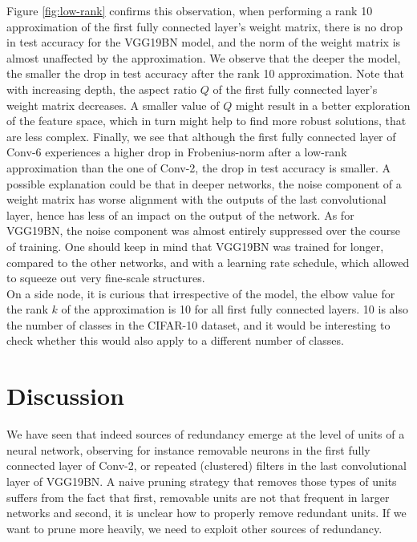 Figure \ref{fig:low-rank} confirms this observation, when performing a rank 10 approximation of the first fully connected layer's weight matrix, there is no drop in test accuracy for the VGG19BN model, and the norm of the weight matrix is almost unaffected by the approximation. We observe that the deeper the model, the smaller the drop in test accuracy after the rank 10 approximation. Note that with increasing depth, the aspect ratio $Q$ of the first fully connected layer's weight matrix decreases. A smaller value of $Q$ might result in a better exploration of the feature space, which in turn might help to find more robust solutions, that are less complex. Finally, we see that although the first fully connected layer of Conv-6 experiences a higher drop in Frobenius-norm after a low-rank approximation than the one of Conv-2, the drop in test accuracy is smaller. A possible explanation could be that in deeper networks, the noise component of a weight matrix has worse alignment with the outputs of the last convolutional layer, hence has less of an impact on the output of the network. As for VGG19BN, the noise component was almost entirely suppressed over the course of training. One should keep in mind that VGG19BN was trained for longer, compared to the other networks, and with a learning rate schedule, which allowed to squeeze out very fine-scale structures. \\

On a side node, it is curious that irrespective of the model, the elbow value for the rank $k$ of the approximation is 10 for all first fully connected layers. 10 is also the number of classes in the CIFAR-10 dataset, and it would be interesting to check whether this would also apply to a different number of classes. \\

\section{Discussion}

We have seen that indeed sources of redundancy emerge at the level of units of a neural network, observing for instance removable neurons in the first fully connected layer of Conv-2, or repeated (clustered) filters in the last convolutional layer of VGG19BN. A naive pruning strategy that removes those types of units suffers from the fact that first, removable units are not that frequent in larger networks and second, it is unclear how to properly remove redundant units. If we want to prune more heavily, we need to exploit other sources of redundancy. \\

